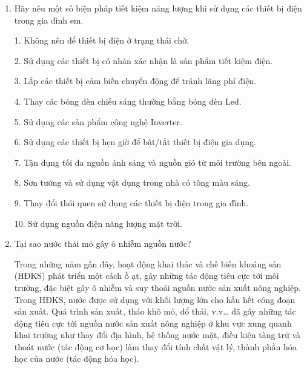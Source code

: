 \begin{enumerate}[label=\bfseries Câu \arabic*:]
	
	\item {}
	
	
	{
		Hãy nêu một số biện pháp tiết kiệm năng lượng khi sử dụng các thiết bị điện trong gia đình em.
	}
	
	\hideall
	{
		1. Không nên để thiết bị điện ở trạng thái chờ.
		
		2. Sử dụng các thiết bị có nhãn xác nhận là sản phẩm tiết kiệm điện.
		
		3. Lắp các thiết bị cảm biến chuyển động để tránh lãng phí điện.
		
		4. Thay các bóng đèn chiếu sáng thường bằng bóng đèn Led.
		
		5. Sử dụng các sản phẩm công nghệ Inverter.
		
		
		6. Sử dụng các thiết bị hẹn giờ để bật/tắt thiết bị điện gia dụng.
		
		7. Tận dụng tối đa nguồn ánh sáng và nguồn gió từ môi trường bên ngoài.
		
		8. Sơn tường và sử dụng vật dụng trong nhà có tông màu sáng.
		
		9. Thay đổi thói quen sử dụng các thiết bị điện trong gia đình.
		
		10. Sử dụng nguồn điện năng lượng mặt trời.
	}
	\item {}
	
	
	{
		Tại sao nước thải mỏ gây ô nhiễm nguồn nước?
	}
	
	\hideall
	{
		Trong những năm gần đây, hoạt động khai thác và chế biến khoáng sản (HĐKS) phát triển một cách ồ ạt, gây những tác động tiêu cực tới môi trường, đặc biệt gây ô nhiễm và suy thoái nguồn nước sản xuất nông nghiệp. Trong HĐKS, nước được sử dụng với khối lượng lớn cho hầu hết công đoạn sản xuất. Quá trình sản xuất, tháo khô mỏ, đổ thải, v.v… đã gây những tác động tiêu cực tới nguồn nước sản xuất nông nghiệp ở khu vực xung quanh khai trường như thay đổi địa hình, hệ thống nước mặt, điều kiện tàng trữ và thoát nước (tác động cơ học) làm thay đổi tính chất vật lý, thành phần hóa học của nước (tác động hóa học).
		
}
\end{enumerate}
